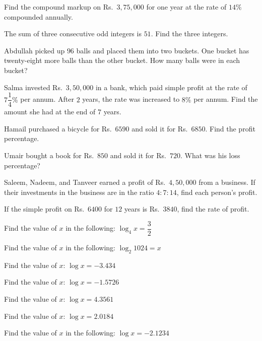 \documentclass[11pt]{article}
\begin{document}
\begin{detq}
\item Find the compound markup on Rs.\ $3{,}75{,}000$ for one year at the rate of $14\%$ compounded annually.

\item The sum of three consecutive odd integers is $51$. Find the three integers.

\item Abdullah picked up $96$ balls and placed them into two buckets. One bucket has twenty-eight more balls than the other bucket. How many balls were in each bucket?

\item Salma invested Rs.\ $3{,}50{,}000$ in a bank, which paid simple profit at the rate of $7\dfrac{1}{4}\%$ per annum. After $2$ years, the rate was increased to $8\%$ per annum. Find the amount she had at the end of $7$ years.

\item Hamail purchased a bicycle for Rs.\ $6590$ and sold it for Rs.\ $6850$. Find the profit percentage.

\item Umair bought a book for Rs.\ $850$ and sold it for Rs.\ $720$. What was his loss percentage?

\item Saleem, Nadeem, and Tanveer earned a profit of Rs.\ $4{,}50{,}000$ from a business. If their investments in the business are in the ratio $4:7:14$, find each person's profit.

\item If the simple profit on Rs.\ $6400$ for $12$ years is Rs.\ $3840$, find the rate of profit.

\item Find the value of $x$ in the following: $\log_4 x = \dfrac{3}{2}$

\item Find the value of $x$ in the following: $\log_2 1024 = x$

\item Find the value of $x$: $\log x = -3.434$

\item Find the value of $x$: $\log x = -1.5726$

\item Find the value of $x$: $\log x = 4.3561$

\item Find the value of $x$: $\log x = 2.0184$

\item Find the value of $x$ in the following: $\log x = -2.1234$


\end{detq}
\end{document}
